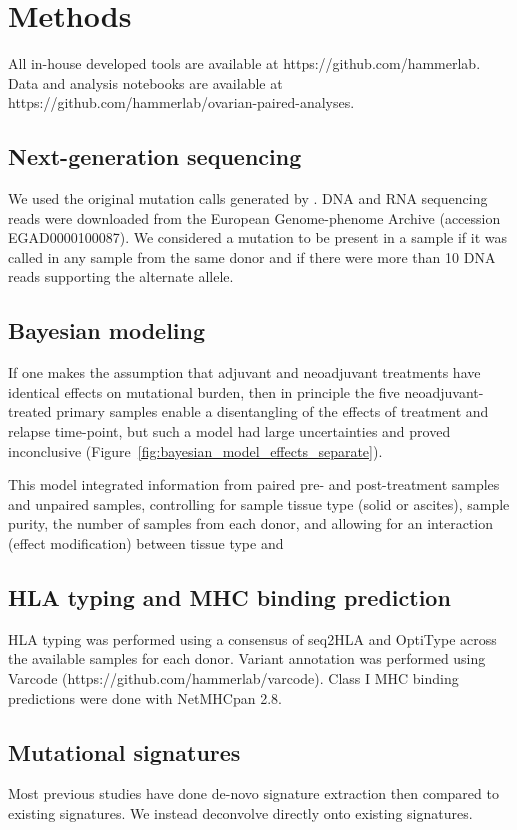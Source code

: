 \section*{Methods}
All in-house developed tools are available at https://github.com/hammerlab. Data and analysis notebooks are available at https://github.com/hammerlab/ovarian-paired-analyses.

\subsection*{Next-generation sequencing}
We used the original mutation calls generated by \cite{Patch_2015}. DNA and RNA sequencing reads were downloaded from the European Genome-phenome Archive (accession EGAD0000100087). We considered a mutation to be present in a sample if it was called in any sample from the same donor and if there were more than 10 DNA reads supporting the alternate allele.

\subsection*{Bayesian modeling}
If one makes the assumption that adjuvant and neoadjuvant treatments have identical effects on mutational burden, then in principle the five neoadjuvant-treated primary samples enable a disentangling of the effects of treatment and relapse time-point, but such a model had large uncertainties and proved inconclusive (Figure~\ref{fig:bayesian_model_effects_separate}). 

This model integrated information from paired pre- and post-treatment samples and unpaired samples, controlling for sample tissue type (solid or ascites), sample purity, the number of samples from each donor, and allowing for an interaction (effect modification) between tissue type and 
 
\subsection*{HLA typing and MHC binding prediction}
HLA typing was performed using a consensus of seq2HLA\cite{Boegel_2012} and OptiType\cite{Szolek_2014} across the available samples for each donor. Variant annotation was performed using Varcode (https://github.com/hammerlab/varcode). Class I MHC binding predictions were done with NetMHCpan 2.8\cite{Lundegaard_2008}.

\subsection*{Mutational signatures}
Most previous studies have done de-novo signature extraction then compared to existing signatures. We instead deconvolve directly onto existing signatures.

